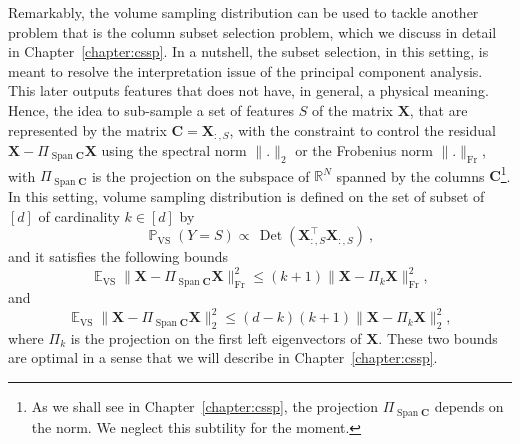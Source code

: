 \documentclass[twoside,11pt]{book}
\newtheorem{theorem}{Theorem}
\numberwithin{theorem}{chapter}
\numberwithin{definition}{chapter}
\numberwithin{proposition}{chapter}
\numberwithin{corollary}{chapter}
\numberwithin{example}{chapter}
\numberwithin{lemma}{chapter}
\numberwithin{assumption}{chapter}
\numberwithin{equation}{chapter}
\numberwithin{figure}{chapter}
\DeclareMathOperator{\Det}{Det}
\DeclareMathOperator{\Span}{\mathrm{Span}}
\DeclareMathOperator{\Fr}{\mathrm{Fr}}
\DeclareMathOperator{\VS}{\mathrm{VS}}
\DeclareMathOperator{\Tran}{\intercal}
\DeclareMathOperator{\EX}{\mathbb{E}}
\DeclareMathOperator{\Prb}{\mathbb{P}}
\begin{document}
Remarkably, the volume sampling distribution can be used to tackle another problem that is the column subset selection problem, which we discuss in detail in Chapter~\ref{chapter:cssp}. In a nutshell, the subset selection, in this setting, is meant to resolve the interpretation issue of the principal component analysis. This later outputs features that does not have, in general, a physical meaning. Hence, the idea to sub-sample a set of  features $S$ of the matrix $\bm{X}$, that are represented by the matrix $\bm{C} = \bm{X}_{:,S}$, with the constraint to control the residual $\bm{X}-\Pi_{\Span \bm{C}}\bm{X}$ using the spectral norm $\|.\|_{2}$ or the Frobenius norm $\|.\|_{\Fr}$, with $\Pi_{\Span \bm{C}}$ is the projection on the subspace of $\mathbb{R}^{N}$ spanned by the columns $\bm{C}$\footnote{As we shall see in Chapter~\ref{chapter:cssp}, the projection $\Pi_{\Span \bm{C}}$ depends on the norm. We neglect this subtility for the moment.}. In this setting, volume sampling distribution is defined on the set of subset of $[d]$ of cardinality $k \in [d]$ by
\begin{equation}
\Prb_{\VS}(Y=S) \propto \,\Det(\bm{X}_{:,S}^{\Tran}\bm{X}_{:,S}^{}) \:,
\label{e:introduction_vs}
\end{equation}
and it satisfies the following bounds \citep*{DRVW06}
\begin{equation}
\EX_{\VS} \| \bm{X} - \Pi_{\Span \bm{C}}\bm{X} \|_{\Fr}^{2} \leq (k+1)\| \bm{X} - \Pi_{k}\bm{X} \|_{\Fr}^{2},
\label{e:introduction_vsBoundFr}
\end{equation}
and
\begin{equation}
\EX_{\VS} \| \bm{X} - \Pi_{\Span \bm{C}}\bm{X} \|_{2}^{2} \leq (d-k)(k+1)\| \bm{X} - \Pi_{k}\bm{X} \|_{2}^{2},
\label{e:introduction_vsBound2}
\end{equation}
where $\Pi_{k}$ is the projection on the first left eigenvectors of $\bm{X}$. These two bounds are optimal in a sense that we will describe in Chapter~\ref{chapter:cssp}.
\end{document}
